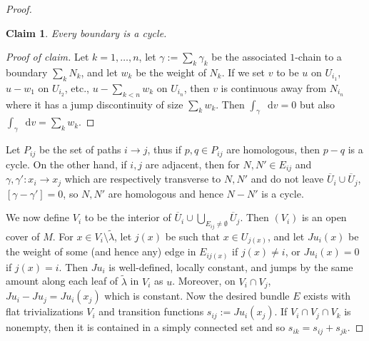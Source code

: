 \documentclass[reqno,10pt]{amsart}
\newcommand*\dif{\mathop{}\!\mathrm{d}}
\newtheorem*{claim}{Claim}
\theoremstyle{definition}
\numberwithin{equation}{section}
\begin{document}
\begin{proof}
\begin{claim}
Every boundary is a cycle.
\end{claim}
\begin{proof}[Proof of claim]
Let $k = 1, \dots, n$, let $\gamma := \sum_k \gamma_k$ be the associated $1$-chain to a boundary $\sum_k N_k$, and let $w_k$ be the weight of $N_k$.
If we set $v$ to be $u$ on $U_{i_1}$, $u - w_1$ on $U_{i_2}$, etc., $u - \sum_{k < n} w_k$ on $U_{i_n}$, then $v$ is continuous away from $N_{i_n}$ where it has a jump discontinuity of size $\sum_k w_k$.
Then $\int_\gamma \dif v = 0$ but also $\int_\gamma \dif v = \sum_k w_k$.
\end{proof}

Let $P_{ij}$ be the set of paths $i \to j$, thus if $p, q \in P_{ij}$ are homologous, then $p - q$ is a cycle.
On the other hand, if $i, j$ are adjacent, then for $N, N' \in E_{ij}$ and $\gamma, \gamma': x_i \to x_j$ which are respectively transverse to $N, N'$ and do not leave $\overline U_i \cup \overline U_j$, $[\gamma - \gamma'] = 0$, so $N, N'$ are homologous and hence $N - N'$ is a cycle.

We now define $V_i$ to be the interior of $\overline U_i \cup \bigcup_{E_{ij} \neq \emptyset} \overline U_j$.
Then $(V_i)$ is an open cover of $M$.
For $x \in V_i \setminus \tilde \lambda$, let $j(x)$ be such that $x \in U_{j(x)}$, and let $Ju_i(x)$ be the weight of some (and hence any) edge in $E_{ij(x)}$ if $j(x) \neq i$, or $Ju_i(x) = 0$ if $j(x) = i$.
Then $Ju_i$ is well-defined, locally constant, and jumps by the same amount along each leaf of $\tilde \lambda$ in $V_i$ as $u$.
Moreover, on $V_i \cap V_j$, $Ju_i - Ju_j = Ju_i(x_j)$ which is constant.
Now the desired bundle $E$ exists with flat trivializations $V_i$ and transition functions $s_{ij} := Ju_i(x_j)$.
If $V_i \cap V_j \cap V_k$ is nonempty, then it is contained in a simply connected set and so $s_{ik} = s_{ij} + s_{jk}$.
\end{proof}
\end{document}
